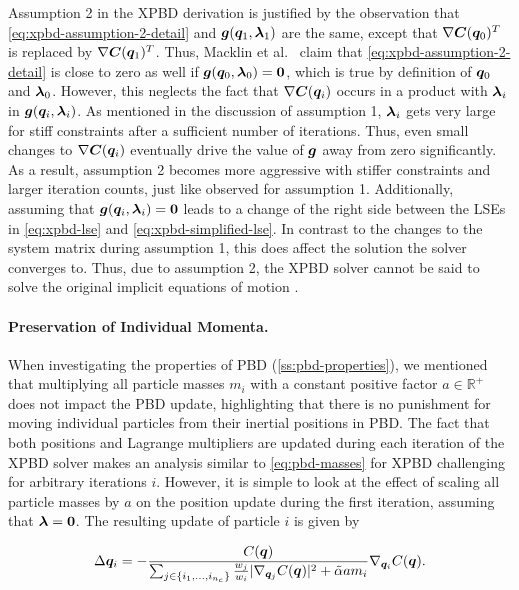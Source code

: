Assumption 2 in the XPBD derivation is justified by the observation that \autoref{eq:xpbd-assumption-2-detail} and $\bm{g}(\bm{q}_1, 
\bm{\lambda}_1)$ are the same, except that $\nabla \bm{C}(\bm{q}_0)^T$ is replaced by $\nabla \bm{C}(\bm{q}_1)^T$. Thus, Macklin et al.\ 
\cite{macklin2016} claim that \autoref{eq:xpbd-assumption-2-detail} is close to zero as well if $\bm{g}(\bm{q}_0, \bm{\lambda}_0) = \bm{0}$, 
which is true by definition of $\bm{q}_0$ and $\bm{\lambda}_0$. However, this neglects the fact that $\nabla \bm{C}(\bm{q}_i)$ occurs in 
a product with $\bm{\lambda}_i$ in $\bm{g}(\bm{q}_i, \bm{\lambda}_i)$. As mentioned in the discussion of assumption 1, 
$\bm{\lambda}_i$ gets very large for stiff constraints after a 
sufficient number of iterations. Thus, even small changes to $\nabla \bm{C}(\bm{q}_i)$ eventually drive the value of $\bm{g}$ away from zero
significantly. As a result, assumption 2 becomes more aggressive with stiffer constraints and larger iteration counts, just like observed
for assumption 1. Additionally, assuming that $\bm{g}(\bm{q}_i, \bm{\lambda}_i) = \bm{0}$ leads to a change of the right side between 
the LSEs in \autoref{eq:xpbd-lse} and \autoref{eq:xpbd-simplified-lse}. In contrast to the changes to the system matrix during assumption 1, 
this does affect the solution the solver converges to. Thus, due to assumption 2, the XPBD solver cannot be said to solve the original 
implicit equations of motion \cite{macklin2016}.

\paragraph{Preservation of Individual Momenta.}
When investigating the properties of PBD (\cref{ss:pbd-properties}), we mentioned that multiplying all particle masses $m_i$ with a constant
positive factor $a \in \mathbb{R}^+$ does not impact the PBD update, highlighting that there is no punishment for moving individual
particles from their inertial positions in PBD. The fact that both positions and Lagrange multipliers are updated during each
iteration of the XPBD solver makes an analysis similar to \autoref{eq:pbd-masses} for XPBD challenging for arbitrary iterations $i$. However, it 
is simple to look at the effect of scaling all particle masses by $a$ on the position update during the first iteration, assuming that 
$\bm{\lambda} = \bm{0}$. The resulting update of particle $i$ is given by

\begin{equation}\label{eq:xpbd-masses}
    \Delta \bm{q}_i 
    = -\frac{C(\bm{q})}{\sum_{j \in \{ i_1, \ldots, i_{n_c} \}} \frac{w_j}{w_i} \vert \nabla_{\bm{q}_j}C(\bm{q}) \vert^2 + \tilde{\alpha}a m_i} 
    \nabla_{\bm{q}_i} C(\bm{q}).
\end{equation}

